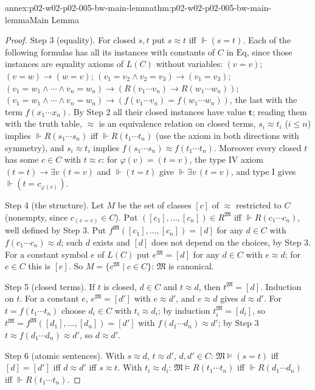 \begin{annexitem}{annex:p02-w02-p02-005-bw-main-lemma}{thm:p02-w02-p02-005-bw-main-lemma}{Main Lemma}
\begin{proof}
Step 3 (equality).  For closed \(s,t\) put \(s\approx t\) iff
\(\Vdash(s=t)\).  Each of the following formulas has all its instances
with constants of \(C\) in \(\mathrm{Eq}\), since those instances are
equality axioms of \(L(C)\) without variables:
\((v=v)\); \((v=w)\to(w=v)\); \((v_1=v_2\land v_2=v_3)\to(v_1=v_3)\);
\((v_1=w_1\land\cdots\land v_n=w_n)\to(R(v_1\cdots v_n)\to R(w_1\cdots w_n))\);
\((v_1=w_1\land\cdots\land v_n=w_n)\to(f(v_1\cdots v_n)=f(w_1\cdots w_n))\),
the last with the term \(f(x_1\cdots x_n)\).  By Step 2 all their closed
instances have value \(\mathbf t\); reading them with the truth table,
\(\approx\) is an equivalence relation on closed terms, \(s_i\approx t_i\)
(\(i\leq n\)) implies \(\Vdash R(s_1\cdots s_n)\) iff
\(\Vdash R(t_1\cdots t_n)\) (use the axiom in both directions with
symmetry), and \(s_i\approx t_i\) implies
\(f(s_1\cdots s_n)\approx f(t_1\cdots t_n)\).  Moreover every closed \(t\)
has some \(c\in C\) with \(t\approx c\): for \(\varphi(v)=(t=v)\), the
type IV axiom \((t=t)\to\exists v\,(t=v)\) and \(\Vdash(t=t)\) give
\(\Vdash\exists v\,(t=v)\), and type I gives \(\Vdash(t=c_{\varphi(v)})\).

Step 4 (the structure).  Let \(M\) be the set of classes \([c]\) of
\(\approx\) restricted to \(C\) (nonempty, since \(c_{(v=v)}\in C\)).  Put
\(([c_1],\ldots,[c_n])\in R^{\mathfrak M}\) iff
\(\Vdash R(c_1\cdots c_n)\), well defined by Step 3.  Put
\(f^{\mathfrak M}([c_1],\ldots,[c_n])=[d]\) for any \(d\in C\) with
\(f(c_1\cdots c_n)\approx d\); such \(d\) exists and \([d]\) does not
depend on the choices, by Step 3.  For a constant symbol \(e\) of
\(L(C)\) put \(e^{\mathfrak M}=[d]\) for any \(d\in C\) with \(e\approx d\);
for \(e\in C\) this is \([e]\).  So \(M=\{c^{\mathfrak M}\mid c\in C\}\):
\(\mathfrak M\) is canonical.

Step 5 (closed terms).  If \(t\) is closed, \(d\in C\) and \(t\approx d\),
then \(t^{\mathfrak M}=[d]\).  Induction on \(t\).  For a constant \(e\),
\(e^{\mathfrak M}=[d']\) with \(e\approx d'\), and \(e\approx d\) gives
\(d\approx d'\).  For \(t=f(t_1\cdots t_n)\) choose \(d_i\in C\) with
\(t_i\approx d_i\); by induction \(t_i^{\mathfrak M}=[d_i]\), so
\(t^{\mathfrak M}=f^{\mathfrak M}([d_1],\ldots,[d_n])=[d']\) with
\(f(d_1\cdots d_n)\approx d'\); by Step 3
\(t\approx f(d_1\cdots d_n)\approx d'\), so \(d\approx d'\).

Step 6 (atomic sentences).  With \(s\approx d\), \(t\approx d'\),
\(d,d'\in C\): \(\mathfrak M\models(s=t)\) iff \([d]=[d']\) iff
\(d\approx d'\) iff \(s\approx t\).  With \(t_i\approx d_i\):
\(\mathfrak M\models R(t_1\cdots t_n)\) iff \(\Vdash R(d_1\cdots d_n)\) iff
\(\Vdash R(t_1\cdots t_n)\).


\end{proof}
\end{annexitem}
